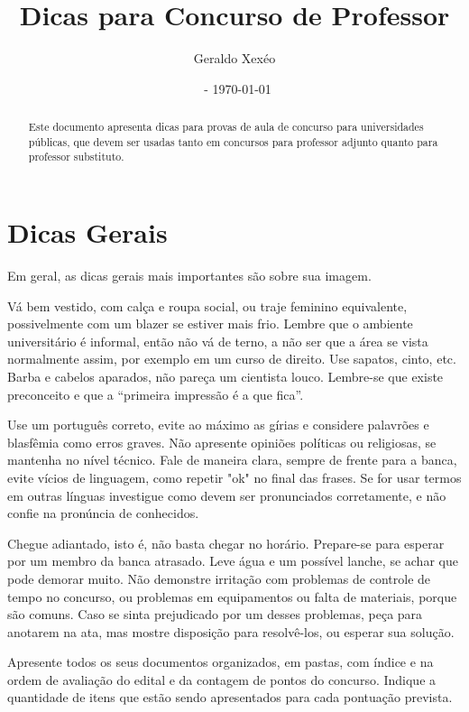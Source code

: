 \documentclass{article}
\title{Dicas para Concurso de Professor}
\author{Geraldo Xexéo}
\affil{\url{xexeo@ufrj.br} \\
\url{http://xexeo.net}}
\date{\ccbyncsa\  - \today}
\begin{document}
\maketitle

\begin{abstract}
    Este documento apresenta dicas para provas de aula de concurso para universidades públicas, que devem ser usadas tanto em concursos para professor adjunto quanto para professor substituto.
\end{abstract}

\section{Dicas Gerais}

Em geral, as dicas gerais mais importantes são sobre sua imagem.

Vá bem vestido, com calça e roupa social, ou traje feminino equivalente, possivelmente com um blazer se estiver mais frio. Lembre que o ambiente universitário é informal, então não vá de terno, a não ser que a área se vista normalmente assim, por exemplo em um curso de direito. Use sapatos, cinto, etc. Barba e cabelos aparados, não pareça um cientista louco. Lembre-se que existe preconceito e que a ``primeira impressão é a que fica''.

Use um português correto, evite ao máximo as gírias e considere palavrões e blasfêmia como erros graves. Não apresente opiniões políticas ou religiosas, se mantenha no nível técnico. Fale de maneira clara, sempre de frente para a banca, evite vícios de linguagem, como repetir "ok" no final das frases. Se for usar termos em outras línguas investigue como devem ser pronunciados corretamente, e não confie na pronúncia de conhecidos.




Chegue adiantado, isto é, não basta chegar no horário. Prepare-se para esperar por um membro da banca atrasado. Leve água e um possível lanche, se achar que pode demorar muito. Não demonstre irritação com problemas de controle de tempo no concurso, ou problemas em equipamentos ou falta de materiais, porque são comuns. Caso se sinta prejudicado por um desses problemas, peça para anotarem na ata, mas mostre disposição para resolvê-los, ou esperar sua solução.

Apresente todos os seus documentos organizados, em pastas, com índice e na ordem de avaliação do edital e da contagem de pontos do concurso. Indique a quantidade de itens que estão sendo apresentados para cada pontuação prevista.
\end{document}
